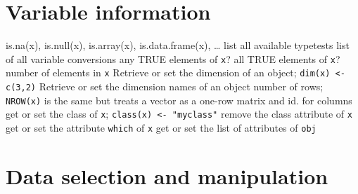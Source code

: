 \section{Variable information}{is.na(x), is.null(x), is.array(x), is.data.frame(x), \ldots}
	{list all available typetests}
	{list of all variable conversions}
	{any TRUE elements of {\tt x}?}
	{all TRUE elements of {\tt x}?}
	{ number of elements in {\tt x}}
	{Retrieve or set the dimension of an object; {\tt dim(x) <- c(3,2)}}
	{Retrieve or set the dimension names of an object}
	{number of rows; {\tt NROW(x)} is the same but treats a vector as a one-row matrix}
	{and}
	{id. for columns}
	{get or set the class of {\tt x}; {\tt class(x) <- "myclass"}}
	{remove the class attribute of {\tt x}}
	{get or set the attribute {\tt which} of {\tt x}}
	{get or set the list of attributes of {\tt obj}}

\section{Data selection and manipulation}{}

